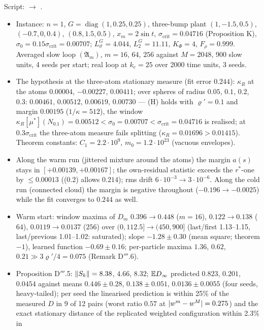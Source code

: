 Script:  $\to$ .
\begin{itemize}
  \item Instance: $n=1$, $G=\operatorname{diag}(1,0.25,0.25)$, three-bump plant $(1,-1.5,0.5)$, $(-0.7,0,0.4)$,
    $(0.8,1.5,0.5)$, $x_m=2\sin t$, $\sigma_{\mathrm{crit}}=0.04716$ (Proposition K),
    $\sigma_0=0.15\sigma_{\mathrm{crit}}=0.00707$; $L_\vartheta^G=4.044$, $L_2^G=11.11$, $K_\Phi=4$, $F_\rho=0.999$.
    Averaged slow loop $(\mathfrak{A}_m)$, $m=16$, $64$, $256$ against $M=2048$, 900 slow units, 4 seeds per start;
    real loop at $k_e=25$ over 2000 time units, 3 seeds.
  \item The hypothesis at the three-atom stationary measure (fit error $0.244$): $\kappa_R$ at the atoms $0.00004$,
    $-0.00227$, $0.00411$; over spheres of radius $0.05$, $0.1$, $0.2$, $0.3$: $0.00461$, $0.00512$, $0.00619$,
    $0.00730$ --- (H) holds with $\varrho'=0.1$ and margin $0.00195$ ($1/\kappa=512$), the window
    $\kappa_R[\mu^*](N_{0.1})=0.00512<\sigma_0=0.00707<\sigma_{\mathrm{crit}}=0.04716$ is realised; at
    $0.3\sigma_{\mathrm{crit}}$ the three-atom measure fails splitting ($\kappa_R=0.01696>0.01415$). Theorem
    constants: $C_1=2.2\cdot10^9$, $m_0=1.2\cdot10^{23}$ (vacuous envelopes).
  \item Along the warm run (jittered mixture around the atoms) the margin $a(s)$ stays in $[+0.00139,+0.00167]$; the
    own-residual statistic exceeds the $r^*$-one by $\le0.00013$ ((0.2) allows $0.214$); rms drift
    $6\cdot10^{-3}\to3\cdot10^{-6}$. Along the cold run (connected cloud) the margin is negative throughout
    ($-0.196\to-0.0025$) while the fit converges to $0.244$ as well.
  \item Warm start: window maxima of $D_m$ $0.396\to0.448$ ($m=16$), $0.122\to0.138$ ($64$), $0.0119\to0.0137$
    ($256$) over $(0,112.5]\to(450,900]$ (last/first 1.13--1.15, last/previous 1.01--1.02: saturated); slope
    $-1.28\pm0.30$ (mean square; theorem $-1$), learned function $-0.69\pm0.16$; per-particle maxima $1.36$, $0.62$,
    $0.21\gg3\varrho'/4=0.075$ (Remark D$'''$.6).
  \item Proposition D$'''$.5: $\lVert S_k\rVert=8.38$, $4.66$, $8.32$; $\mathbb{E} D_\infty$ predicted $0.823$, $0.201$, $0.0454$
    against means $0.446\pm0.28$, $0.138\pm0.051$, $0.0136\pm0.0055$ (four seeds, heavy-tailed); per seed the
    linearised prediction is within 25\% of the measured $D$ in 9 of 12 pairs (worst ratio $0.57$ at
    $\lvert w^m-w^M\rvert=0.275$) and the exact stationary distance of the replicated weighted configuration within 2.3\% in

\end{itemize}
